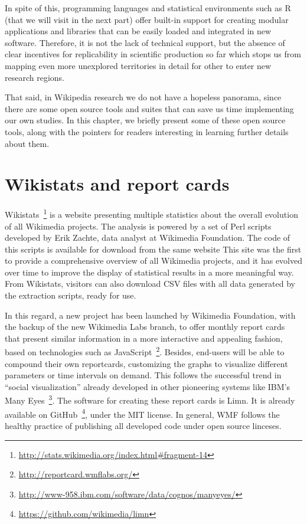 In spite of this, programming languages and statistical environments such
as R (that we will visit in the next part) offer built-in support for creating
modular applications and libraries that can be easily loaded and integrated in new
software. Therefore, it is not the lack of technical support, but the absence of clear
incentives for replicability in scientific production so far which stops us
from mapping even more unexplored territories in detail for other to enter new 
research regions.

That said, in Wikipedia research we do not have a hopeless panorama, since there
are some open source tools and suites that can save us time implementing our own
studies. In this chapter, we briefly present some of these open source tools, along
with the pointers for readers interesting in learning further details about them.

\section{Wikistats and report cards}
Wikistats~\footnote{\url{http://stats.wikimedia.org/index.html\#fragment-14}} is a
website presenting multiple statistics about the overall evolution of all Wikimedia
projects. The analysis is powered by a set of Perl scripts developed by Erik
Zachte, data analyst at Wikimedia Foundation. The code of this scripts is available
for download from the same website This site was the first to provide
a comprehensive overview of all Wikimedia projects, and it has evolved over time
to improve the display of statistical results in a more meaningful way. From
Wikistats, visitors can also download CSV files with all data generated by the
extraction scripts, ready for use.

In this regard, a new project  has been launched by Wikimedia Foundation, with
the backup of the new Wikimedia Labs branch, to offer monthly report cards that
present similar information in a more interactive and appealing fashion, based on
technologies such as JavaScript~\footnote{\url{http://reportcard.wmflabs.org/}}.
Besides, end-users will be able to compound their own reportcards, customizing the
graphs to visualize different parameters or time intervals on demand. This follows
the successful trend in ``social visualization'' already developed in other
pioneering systems like IBM's Many Eyes~\footnote{\url{http://www-958.ibm.com/software/data/cognos/manyeyes/}}. 
The software for creating these report cards is Limn. It is already available 
on GitHub~\footnote{\url{https://github.com/wikimedia/limn}}, under the MIT license. 
In general, WMF follows the healthy practice of publishing all developed code 
under open source linceses.

